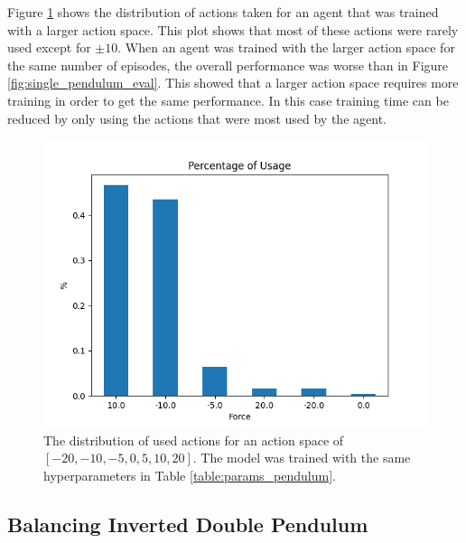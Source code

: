 \documentclass[final]{LTHtwocol} %
\begin{document}
Figure \ref{fig:pendulum_force} shows the distribution of actions taken for an agent that was trained with a larger action space. This plot shows that most of these actions were rarely used except for $\pm 10$. When an agent was trained with the larger action space for the same number of episodes, the overall performance was worse than in Figure \ref{fig:single_pendulum_eval}. This showed that a larger action space requires more training in order to get the same performance. In this case training time can be reduced by only using the actions that were most used by the agent.
\begin{figure}[htp]
	\centering
	\includegraphics[width=0.9\columnwidth]{figures/Pendulum_force.png}
	\caption{The distribution of used actions for an action space of $[-20,-10,-5,0,5,10,20]$. The model was trained with the same hyperparameters in Table \ref{table:params_pendulum}.}
	\label{fig:pendulum_force}
\end{figure}



\subsection{Balancing Inverted Double Pendulum}
\end{document}
